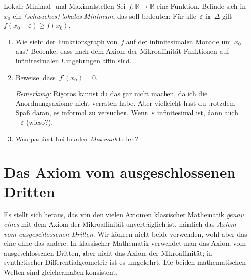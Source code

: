 \documentclass[twoside]{../zirkelblatt}
\newcommand{\RR}{\mathbb{R}}
\theoremstyle{definition}
\theoremstyle{plain}
\theoremstyle{remark}
\begin{document}
\begin{aufgabeShaded}{Lokale Minimal- und Maximalstellen}
Sei~$f : \RR \to \RR$ eine Funktion. Befinde sich in~$x_0$ ein
\emph{(schwaches) lokales Minimum}, das soll bedeuten: Für alle~$\varepsilon$
in~$\Delta$ gilt~$f(x_0 + \varepsilon) \geq f(x_0)$.

\begin{enumerate}
\item Wie sieht der Funktionsgraph von~$f$ auf der infinitesimalen Monade
um~$x_0$ aus? Bedenke, dass nach dem Axiom der Mikroaffinität Funktionen auf
infinitesimalen Umgebungen affin sind.
\item Beweise, dass~$f'(x_0) = 0$.

\emph{Bemerkung:} Rigoros kannst du das gar nicht machen, da ich die
Anordnungsaxiome nicht verraten habe. Aber vielleicht hast du trotzdem Spaß
daran, es informal zu versuchen. Wenn~$\varepsilon$ infinitesimal ist, dann
auch~$-\varepsilon$ (wieso?).
\item Was passiert bei lokalen \emph{Maximal}stellen?
\end{enumerate}
\end{aufgabeShaded}



\section{Das Axiom vom ausgeschlossenen Dritten}
\label{sect:lem}

Es stellt sich heraus, das von den vielen Axiomen klassischer Mathematik
\emph{genau eines} mit dem Axiom der Mikroaffinität unverträglich ist, nämlich
das \emph{Axiom vom ausgeschlossenen Dritten}. Wir können nicht beide
verwenden, wohl aber das eine ohne das andere. In klassischer Mathematik
verwendet man das Axiom vom ausgeschlossenen Dritten, aber nicht das Axiom der
Mikroaffinität; in synthetischer Differentialgeometrie ist es umgekehrt. Die
beiden mathematischen Welten sind gleichermaßen konsistent.
\end{document}

